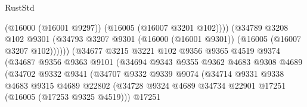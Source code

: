 \begin{lexlean}{RustStd}
\begin{coremodule}
                                          (@16000 (@16001 @9297))
                                          (@16005 (@16007 @3201 @102))))
                                      (@34789
                                        @3208
                                        @102
                                        @9301
                                        (@34793
                                          @3207
                                          @9301
                                          (@16000 (@16001 @9301))
                                          (@16005 (@16007 @3207 @102))))))
                                  (@34677
                                    @3215
                                    @3221
                                    @102
                                    @9356
                                    @9365
                                    @4519
                                    @9374
                                    (@34687
                                      @9356
                                      @9363
                                      @9101
                                      (@34694
                                        @9343
                                        @9355
                                        @9362
                                        @4683
                                        @9308
                                        @4689
                                        (@34702
                                          @9332
                                          @9341
                                          (@34707
                                            @9332
                                            @9339
                                            @9074
                                            (@34714
                                              @9331
                                              @9338
                                              @4683
                                              @9315
                                              @4689
                                              @22802
                                              (@34728
                                                @9324
                                                @4689
                                                @34734
                                                @22901
                                                @17251
                                                (@16005 (@17253 @9325 @4519)))
                                              @17251

\end{coremodule}
\end{lexlean}
